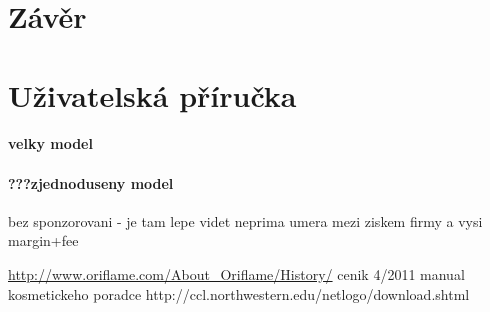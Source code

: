 \documentclass[a4wide,12pt]{report}
\begin{document}
\chapter*{Závěr}
\addtocounter{chapter}{1}

\chapter*{Uživatelská příručka}
\addtocounter{chapter}{1}
\subsubsection{velky model}
\subsubsection{???zjednoduseny model}
bez sponzorovani - je tam lepe videt neprima umera mezi ziskem firmy a vysi margin+fee
\begin{thebibliography}{9}


\end{thebibliography}
\url{http://www.oriflame.com/About_Oriflame/History/}
cenik 4/2011
manual kosmetickeho poradce
http://ccl.northwestern.edu/netlogo/download.shtml
\end{document}
